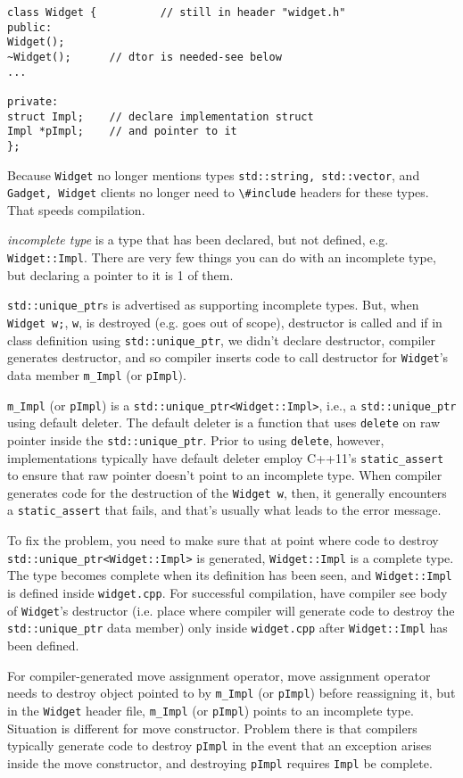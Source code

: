 \documentclass[10pt]{amsart}
\begin{document}
\begin{multicols*}{2}
\begin{lstlisting}
class Widget { 			// still in header "widget.h" 
public:
Widget();
~Widget();		// dtor is needed-see below 
... 

private:
struct Impl;	// declare implementation struct 
Impl *pImpl;	// and pointer to it
};
\end{lstlisting}

Because \verb|Widget| no longer mentions types \verb|std::string, std::vector|, and \verb|Gadget, Widget| clients no longer need to \verb|\#include| headers for these types.  That speeds compilation.  

\emph{incomplete type} is a type that has been declared, but not defined, e.g. \verb|Widget::Impl|.  There are very few things you can do with an incomplete type, but declaring a pointer to it is 1 of them.  

\verb|std::unique_ptr|s is advertised as supporting incomplete types.  But, when \verb|Widget w;|, \verb|w|, is destroyed (e.g. goes out of scope), destructor is called and if in class definition using \verb|std::unique_ptr|, we didn't declare destructor, compiler generates destructor, and so compiler inserts code to call destructor for \verb|Widget|'s data member \verb|m_Impl| (or \verb|pImpl|).  

\verb|m_Impl| (or \verb|pImpl|) is a \verb|std::unique_ptr<Widget::Impl>|, i.e., a \verb|std::unique_ptr| using default deleter. The default deleter is a function that uses \verb|delete| on raw pointer inside the \verb|std::unique_ptr|.  Prior to using \verb|delete|, however, implementations typically have default deleter employ C++11's \verb|static_assert| to ensure that raw pointer doesn't point to an incomplete type.  When compiler generates code for the destruction of the \verb|Widget w|, then, it generally encounters a \verb|static_assert| that fails, and that's usually what leads to the error message.  

To fix the problem, you need to make sure that at point where code to destroy \verb|std::unique_ptr<Widget::Impl>| is generated, \verb|Widget::Impl| is a complete type.  The type becomes complete when its definition has been seen, and \verb|Widget::Impl| is defined inside \verb|widget.cpp|.  For successful compilation, have compiler see body of \verb|Widget|'s destructor (i.e. place where compiler will generate code to destroy the \verb|std::unique_ptr| data member) only inside \verb|widget.cpp| after \verb|Widget::Impl| has been defined.  

For compiler-generated move assignment operator, move assignment operator needs to destroy object pointed to by \verb|m_Impl| (or \verb|pImpl|) before reassigning it, but in the \verb|Widget| header file, \verb|m_Impl| (or \verb|pImpl|) points to an incomplete type.  Situation is different for move constructor.  Problem there is that compilers typically generate code to destroy \verb|pImpl| in the event that an exception arises inside the move constructor, and destroying \verb|pImpl| requires \verb|Impl| be complete.  


\end{multicols*}
\end{document}
